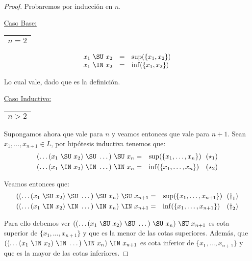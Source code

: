   \begin{proof}
    \PN Probaremos por inducción en $n$.

    \vspace{3mm}
    \PN \underline{Caso Base:} \begin{tabular}{|c|} \hline $n = 2$ \\\hline \end{tabular}
    \[
      \begin{array}{rcl}
        x_{1} \ \SU \ x_{2} &=& \sup(\{x_{1}, x_{2}\}) \\
        x_{1} \ \IN \ x_{2} &=& \inf(\{x_{1}, x_{2}\})
      \end{array}
    \]

    \PN Lo cual vale, dado que es la definición.

    \vspace{3mm}
		\PN \underline{Caso Inductivo:} \begin{tabular}{|c|} \hline $n > 2$ \\\hline \end{tabular}

    \PN Supongamos ahora que vale para $n$ y veamos entonces que vale para $n+1$. Sean $x_{1}, \dotsc, x_{n+1} \in L$,
    por hipótesis inductiva tenemos que:
    \begin{eqnarray*}
      (\dotsc (x_{1} \ \SU \ x_{2}) \ \SU \ \dotsc) \ \SU \ x_{n} &=& \sup(\{x_{1}, \dotsc, x_{n}\}) \ \ (\star_{1}) \\
      (\dotsc (x_{1} \ \IN \ x_{2}) \ \IN \ \dotsc) \ \IN \ x_{n} &=& \inf(\{x_{1}, \dotsc, x_{n}\}) \ \ \ (\star_{2})
    \end{eqnarray*}


    \PN Veamos entonces que:
    \begin{eqnarray*}
      ((\dotsc(x_{1} \ \SU \ x_{2}) \ \SU \ \dotsc) \ \SU \ x_{n}) \ \SU \ x_{n+1} &=& \sup(\{x_{1}, \dotsc, x_{n+1}\})
        \ \ (\dag_{1}) \\
      ((\dotsc(x_{1} \ \IN \ x_{2}) \ \IN \ \dotsc) \ \IN \ x_{n}) \ \IN \ x_{n+1} &=& \inf(\{x_{1}, \dotsc, x_{n+1}\})
        \ \ \ (\dag_{2})
    \end{eqnarray*}

    \PN Para ello debemos ver $((\dotsc(x_{1} \ \SU \ x_{2}) \ \SU \ \dotsc) \ \SU \ x_{n}) \ \SU \ x_{n+1}$ es cota
    superior de $\{x_{1}, \dotsc, x_{n+1}\}$ y que es la menor de las cotas superiores. Además, que $((\dotsc(x_{1} \
    \IN \ x_{2}) \ \IN \ \dotsc) \ \IN \ x_{n}) \ \IN \ x_{n+1}$ es cota inferior de $\{x_{1}, \dotsc, x_{n+1}\}$ y que
    es la mayor de las cotas inferiores.


\end{proof}
